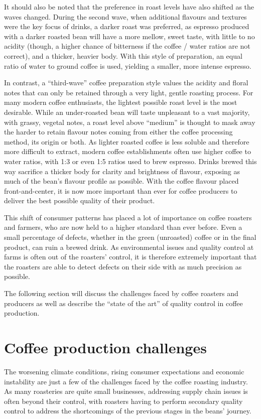 \documentclass{./styles/UoYCSproject}
\begin{document}
It should also be noted that the preference in roast levels have also shifted as the waves changed.
During the second wave, when additional flavours and textures were the key focus of drinks,
a darker roast was preferred, as espresso produced with a darker roasted bean will have a more mellow,
sweet taste, with little to no acidity (though, a higher chance of bitterness if the coffee / water ratios are not correct),
and a thicker, heavier body.
With this style of preparation, an equal ratio of water to ground coffee is used, yielding a smaller, more intense espresso.

In contrast, a ``third-wave'' coffee preparation style values the acidity and floral notes that can only be retained
through a very light, gentle roasting process.
For many modern coffee enthusiasts, the lightest possible roast level is the most desirable.
While an under-roasted bean will taste unpleasant to a vast majority, with grassy, vegetal notes,
a roast level above ``medium'' is thought to mask away the harder to retain flavour notes
coming from either the coffee processing method, its origin or both.
As lighter roasted coffee is less soluble and therefore more difficult to extract,
modern coffee establishments often use higher coffee to water ratios, with 1:3 or even 1:5 ratios used to brew espresso.
Drinks brewed this way sacrifice a thicker body for clarity and brightness of flavour, exposing as much of the bean's
flavour profile as possible.
With the coffee flavour placed front-and-center, it is now more important than ever for coffee producers to deliver
the best possible quality of their product.

This shift of consumer patterns has placed a lot of importance on coffee roasters and farmers,
who are now held to a higher standard than ever before.
Even a small percentage of defects, whether in the green (unroasted) coffee or in the final product,
can ruin a brewed drink.
As environmental issues and quality control at farms is often out of the roasters' control,
it is therefore extremely important that the roasters are able to detect defects on their side
with as much precision as possible.


The following section will discuss the challenges faced by coffee roasters and producers
as well as describe the ``state of the art'' of quality control in coffee production.

\section{Coffee production challenges}
\label{sec:coffee-production-challenges}
The worsening climate conditions, rising consumer expectations and economic instability are just a few of the challenges
faced by the coffee roasting industry.
As many roasteries are quite small businesses, addressing supply chain issues is often beyond their control,
with roasters having to perform secondary quality control to address the shortcomings of the previous stages in the beans'
journey.
\end{document}
